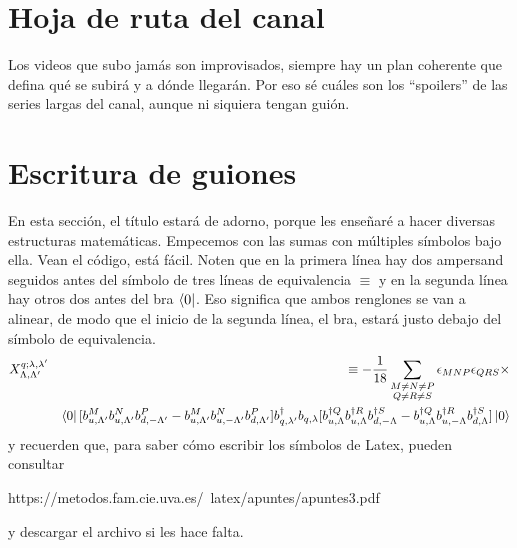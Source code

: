 \documentclass[letter,twoside,12pt]{book}
\begin{document}
\section{Hoja de ruta del canal}\label{sec:descr}
Los videos que subo jamás son improvisados, siempre hay un plan coherente que defina qué se subirá y a dónde llegarán. Por eso sé cuáles son los ``spoilers'' de las series largas del canal, aunque ni siquiera tengan guión.

\section{Escritura de guiones} \label{sec:bag}
En esta sección, el título estará de adorno, porque les enseñaré a hacer diversas estructuras matemáticas. Empecemos con las sumas con múltiples símbolos bajo ella. Vean el código, está fácil. Noten que en la primera línea hay dos ampersand seguidos antes del símbolo de tres líneas de equivalencia $\equiv$ y en la segunda línea hay otros dos antes del bra $\bra{0}$. Eso significa que ambos renglones se van a alinear, de modo que el inicio de la segunda línea, el bra, estará justo debajo del símbolo de equivalencia.
%
\begin{eqnarray}
    X^{q;\lambda,\lambda'}_{\Lambda,\Lambda'}&&\equiv -\frac{1}{18}
    \sum_{\substack{M \neq N \neq P\\Q \neq R \neq S}}\epsilon_
    {MNP}\epsilon_{QRS} \times \nonumber\\
    &&\bra{0}[b_{u,\Lambda'}^M
    b_{u,\Lambda'}^Nb_{d,-\Lambda'}^P-b_{u,\Lambda'}^M
    b_{u,-\Lambda'}^Nb_{d,\Lambda'}^P]b_{q,\lambda'}^{\dagger}
    b_{q,\lambda}[b_{u,\Lambda}^{\dagger Q}
    b_{u,\Lambda}^{\dagger R}b_{d,-\Lambda}^{\dagger S}-b_{u,\Lambda}^{\dagger Q}
    b_{u,-\Lambda}^{\dagger R}b_{d,\Lambda}^{\dagger S}]\ket{0}\nonumber\\ \label{C}
\end{eqnarray}
%
y recuerden que, para saber cómo escribir los símbolos de Latex, pueden consultar 

https://metodos.fam.cie.uva.es/~latex/apuntes/apuntes3.pdf 

y descargar el archivo si les hace falta.
\end{document}
